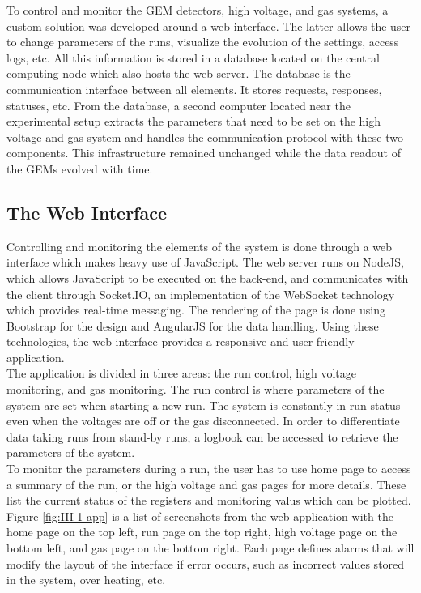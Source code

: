     To control and monitor the GEM detectors, high voltage, and gas systems, a custom solution was developed around a web interface. The latter allows the user to change parameters of the runs, visualize the evolution of the settings, access logs, etc. All this information is stored in a database located on the central computing node which also hosts the web server. The database is the communication interface between all elements. It stores requests, responses, statuses, etc. From the database, a second computer located near the experimental setup extracts the parameters that need to be set on the high voltage and gas system and handles the communication protocol with these two components. This infrastructure remained unchanged while the data readout of the GEMs evolved with time.

    \subsection{The Web Interface}

      Controlling and monitoring the elements of the system is done through a web interface which makes heavy use of JavaScript. The web server runs on NodeJS, which allows JavaScript to be executed on the back-end, and communicates with the client through Socket.IO, an implementation of the WebSocket technology which provides real-time messaging. The rendering of the page is done using Bootstrap for the design and AngularJS for the data handling. Using these technologies, the web interface provides a responsive and user friendly application. \\

      The application is divided in three areas: the run control, high voltage monitoring, and gas monitoring. The run control is where parameters of the system are set when starting a new run. The system is constantly in run status even when the voltages are off or the gas disconnected. In order to differentiate data taking runs from stand-by runs, a logbook can be accessed to retrieve the parameters of the system. \\

      To monitor the parameters during a run, the user has to use home page to access a summary of the run, or the high voltage and gas pages for more details. These list the current status of the registers and monitoring valus which can be plotted. Figure \ref{fig:III-1-app} is a list of screenshots from the web application with the home page on the top left, run page on the top right, high voltage page on the bottom left, and gas page on the bottom right. Each page defines alarms that will modify the layout of the interface if error occurs, such as incorrect values stored in the system, over heating, etc. \\

